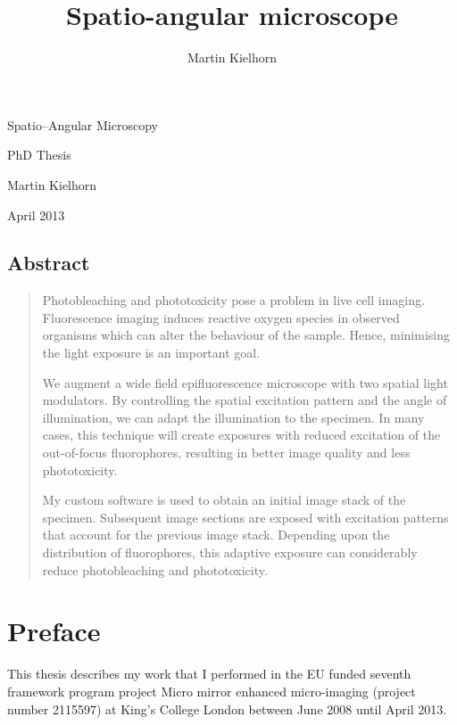 \documentclass[oneside,a4paper,12pt,BCOR20mm,DIV14]{scrbook} %
\title{Spatio-angular microscope} %
\author{Martin Kielhorn}
\def\svgending{\ifx\pdfoutput\undefined%
  .eps_tex%
  \else%
  .pdf_tex%
  \fi}
\newcommand{\svginput}[2]{{\def\svgscale{#1}}}
\newenvironment{summary}{\begin{quote}\small}{\end{quote}}
\begin{document}
\listoftodos
\begin{titlepage}
  
  \hspace{-4cm}
  \svginput{1}{objective-trace}



  \vspace{-5cm}
  
  \hspace{4cm}\textsf{\Huge Spatio--Angular Microscopy}
  
  \vspace{2cm}
  \hspace{6cm}\textsf{\huge PhD Thesis}


  \vspace{3cm}
  \hspace{4cm}\textsf{\Large Martin Kielhorn}
  
  \vspace{1cm}
  \hspace{4cm}\textsf{\Large April 2013}
\end{titlepage}
\newpage
\section*{Abstract}
\begin{summary}
  Photobleaching and phototoxicity pose a problem in live cell
  imaging. Fluorescence imaging induces reactive oxygen species in
  observed organisms which can alter the behaviour of the
  sample. Hence, minimising the light exposure is an important goal.

  We augment a wide field epifluorescence microscope with two spatial
  light modulators. By controlling the spatial excitation pattern and
  the angle of illumination, we can adapt the illumination to the
  specimen. In many cases, this technique will create exposures with
  reduced excitation of the out-of-focus fluorophores, resulting in
  better image quality and less phototoxicity.

  My custom software is used to obtain an initial image stack of the
  specimen. Subsequent image sections are exposed with excitation
  patterns that account for the previous image stack. Depending
  upon the distribution of fluorophores, this adaptive exposure can
  considerably reduce photobleaching and phototoxicity.
\end{summary}


\chapter*{Preface}
This thesis describes my work that I performed in the EU funded
seventh framework program project Micro mirror enhanced micro-imaging
(project number 2115597) at King's College London between June 2008
until April 2013.
\end{document}

